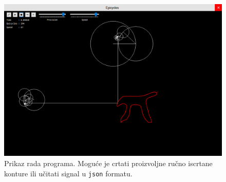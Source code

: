 \begin{figure}
    \includegraphics[scale=0.37]{images/impl3.PNG}
    \caption{Prikaz rada programa. Mogu\'c{}e je crtati proizvoljne ru\v{c}no iscrtane konture ili u\v{c}itati signal u \texttt{json} formatu.}
    \label{fig:impl}
\end{figure}

